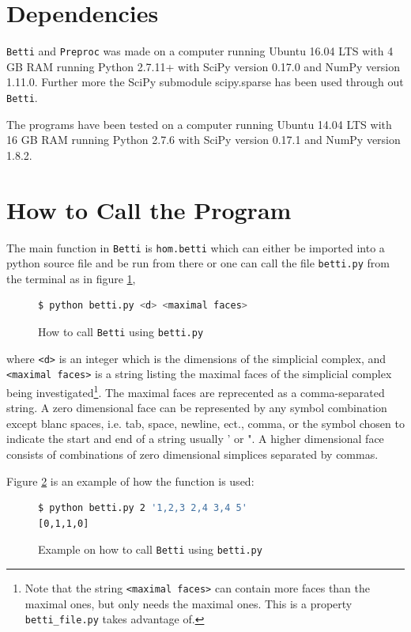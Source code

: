 \documentclass[11pt,a4paper,twoside, openright]{report}
\begin{document}
\section{Dependencies}\label{ch:dependencies}
\texttt{Betti} and \texttt{Preproc} was made on a computer running Ubuntu 16.04 LTS with 4 GB RAM running Python 2.7.11+ with SciPy version 0.17.0 and NumPy version 1.11.0. Further more the SciPy submodule scipy.sparse has been used through out \texttt{Betti}.

The programs have been tested on a computer running Ubuntu 14.04 LTS with 16 GB RAM running Python 2.7.6 with SciPy version 0.17.1 and NumPy version 1.8.2.

\section{How to Call the Program} \label{ch:how2call}
The main function in \texttt{Betti} is \texttt{hom.betti} which can either be imported into a python source file and be run from there or one can call the file \texttt{betti.py} from the terminal as in figure \ref{fig:bettipseudo},
\begin{figure}[H]
\begin{lstlisting}[language=bash]
$ python betti.py <d> <maximal faces> 
\end{lstlisting}
\caption{How to call \texttt{Betti} using \texttt{betti.py}}
\label{fig:bettipseudo}
\end{figure}
where \texttt{<d>} is an integer which is the dimensions of the simplicial complex, and \texttt{<maximal faces>} is a string listing the maximal faces of the simplicial complex being investigated\footnote{Note that the string \texttt{<maximal faces>} can contain more faces than the maximal ones, but only needs the maximal ones. This is a property \texttt{betti\_file.py} takes advantage of.}. The maximal faces are reprecented as a comma-separated string. A zero dimensional face can be represented by any symbol combination except blanc spaces, i.e. tab, space, newline, ect., comma, or the symbol chosen to indicate the start and end of a string usually ' or ". A higher dimensional face consists of combinations of zero dimensional simplices separated by commas.

Figure \ref{fig:betti} is an example of how the function is used:
\begin{figure}[H]
\begin{lstlisting}[language=bash]
$ python betti.py 2 '1,2,3 2,4 3,4 5'
[0,1,1,0] 
\end{lstlisting}
\caption{Example on how to call \texttt{Betti} using \texttt{betti.py} }
\label{fig:betti}
\end{figure}
\end{document}
